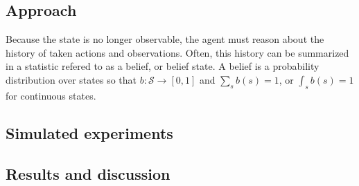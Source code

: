 \subsection{Approach}


Because the state is no longer observable, the agent must reason about the history of taken actions and observations. Often, this history can be summarized in a statistic refered to as a belief, or belief state. A belief is a probability distribution over states so that $b: \mathcal{S} \rightarrow [0,1]$ and $\sum_{s} b(s)=1$, or $\int_{s} b(s)=1$ for continuous states. 

\subsection{Simulated experiments}

\subsection{Results and discussion}